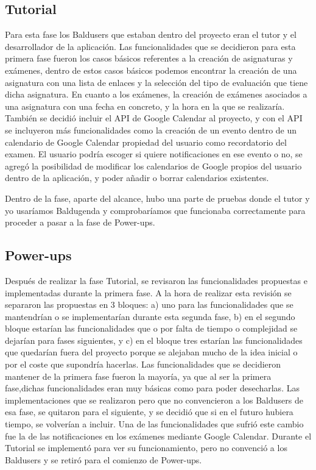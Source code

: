 \subsection{Tutorial}
\label{subsecc:Tutorial}

Para esta fase los Baldusers que estaban dentro del proyecto eran el tutor y el desarrollador de la aplicación. Las funcionalidades que se decidieron para esta primera fase fueron los casos básicos referentes a la creación de asignaturas y exámenes, dentro de estos casos básicos podemos encontrar la creación de una asignatura con una lista de enlaces y la selección del tipo de evaluación que tiene dicha asignatura. En cuanto a los exámenes, la creación de exámenes asociados a una asignatura con una fecha en concreto, y la hora en la que se realizaría.
También se decidió incluir el API de Google Calendar al proyecto, y con el API se incluyeron más funcionalidades como la creación de un evento dentro de un calendario de Google Calendar propiedad del usuario como recordatorio del examen. El usuario podría escoger si quiere notificaciones en ese evento o no, se agregó la  posibilidad de modificar los calendarios de Google propios del usuario dentro de la aplicación, y poder añadir o borrar calendarios existentes.
 
Dentro de la fase, aparte del alcance, hubo una parte de pruebas donde el tutor y yo usaríamos Baldugenda y comprobaríamos que funcionaba correctamente para proceder a pasar a la fase de Power-ups.


\subsection{Power-ups}
\label{subsecc:Powerups}

Después de realizar la fase Tutorial, se revisaron las funcionalidades propuestas e implementadas durante la primera fase. A la hora de realizar esta revisión se separaron las propuestas en 3 bloques: a) uno para las funcionalidades que se mantendrían o se implementarían durante esta segunda fase, b) en el segundo bloque estarían las funcionalidades que o por falta de tiempo o complejidad se dejarían para fases siguientes, y c) en el bloque tres estarían las funcionalidades que quedarían fuera del proyecto porque se alejaban mucho de la idea inicial o por el coste que supondría hacerlas.
Las funcionalidades que se decidieron mantener de la primera fase fueron la mayoría, ya que al ser la primera fase,dichas funcionalidades eran  muy básicas como para poder desecharlas. Las implementaciones que se realizaron pero que no convencieron a los Baldusers de esa fase, se quitaron para el siguiente, y se decidió que si en el futuro hubiera tiempo, se volverían a incluir. Una de las funcionalidades que sufrió este cambio fue la de las notificaciones en los exámenes mediante Google Calendar. Durante el Tutorial se implementó para ver su funcionamiento, pero no convenció a los Baldusers y se retiró para el comienzo de Power-ups.

